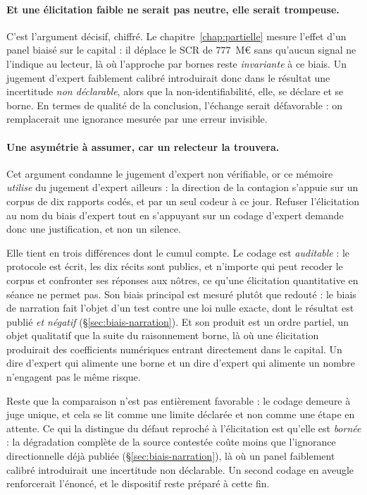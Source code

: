 \paragraph{Et une élicitation faible ne serait pas neutre, elle serait trompeuse.} C'est
l'argument décisif, chiffré. Le chapitre~\ref{chap:partielle} mesure l'effet d'un
panel biaisé sur le capital : il déplace le SCR de $777$~M\euro{} sans
qu'aucun signal ne l'indique au lecteur, là où l'approche par bornes reste \emph{invariante} à
ce biais. Un jugement d'expert faiblement calibré introduirait donc dans le résultat une
incertitude \emph{non déclarable}, alors que la non-identifiabilité, elle, se déclare et se
borne. En termes de qualité de la conclusion, l'échange serait défavorable : on remplacerait
une ignorance mesurée par une erreur invisible.

\paragraph{Une asymétrie à assumer, car un relecteur la trouvera.} Cet argument condamne le
jugement d'expert non vérifiable, or ce mémoire \emph{utilise} du jugement d'expert ailleurs :
la direction de la contagion s'appuie sur un corpus de dix rapports codés, et par un seul codeur
à ce jour. Refuser l'élicitation au nom du biais d'expert tout en s'appuyant sur un codage
d'expert demande donc une justification, et non un silence.

Elle tient en trois différences dont le cumul compte. Le codage est
\emph{auditable} : le protocole est écrit, les dix récits sont publics, et n'importe qui peut
recoder le corpus et confronter ses réponses aux nôtres, ce qu'une élicitation quantitative en
séance ne permet pas. Son biais principal est mesuré plutôt que redouté : le biais de
narration fait l'objet d'un test contre une loi nulle exacte, dont le résultat est publié
\emph{et négatif} (\S\ref{sec:biais-narration}). Et son produit est un ordre partiel,
un objet qualitatif que la suite du raisonnement borne, là où une élicitation produirait des
coefficients numériques entrant directement dans le capital. Un dire d'expert qui alimente une
borne et un dire d'expert qui alimente un nombre n'engagent pas le même risque.

Reste que la comparaison n'est pas entièrement favorable : le codage demeure à juge
unique, et cela se lit comme une limite déclarée et non comme une étape en attente. Ce
qui la distingue du défaut reproché à l'élicitation est qu'elle est \emph{bornée} : la
dégradation complète de la source contestée coûte moins que l'ignorance directionnelle déjà
publiée (\S\ref{sec:biais-narration}), là où un panel faiblement calibré introduirait une
incertitude non déclarable. Un second codage en aveugle renforcerait l'énoncé, et le dispositif
reste préparé à cette fin.

